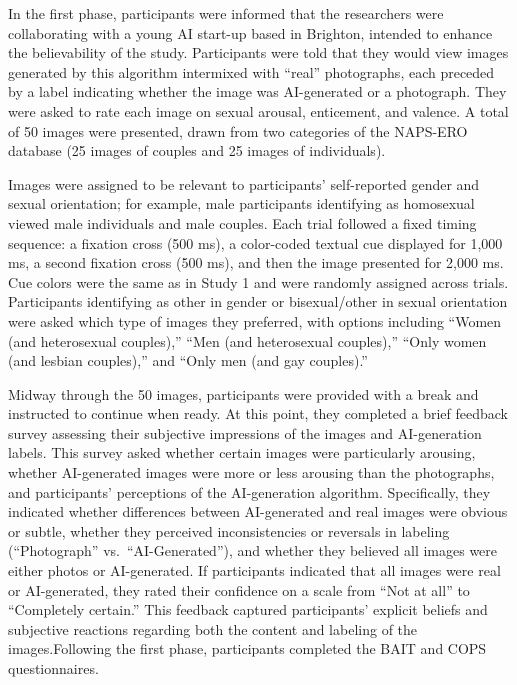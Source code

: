 \documentclass[
  jou,
  floatsintext,
  longtable,
  nolmodern,
  notxfonts,
  notimes,
  colorlinks=true,linkcolor=blue,citecolor=blue,urlcolor=blue]{apa7}
\begin{document}
In the first phase, participants were informed that the researchers were
collaborating with a young AI start-up based in Brighton, intended to
enhance the believability of the study. Participants were told that they
would view images generated by this algorithm intermixed with ``real''
photographs, each preceded by a label indicating whether the image was
AI-generated or a photograph. They were asked to rate each image on
sexual arousal, enticement, and valence. A total of 50 images were
presented, drawn from two categories of the NAPS-ERO database (25 images
of couples and 25 images of individuals).

Images were assigned to be relevant to participants' self-reported
gender and sexual orientation; for example, male participants
identifying as homosexual viewed male individuals and male couples. Each
trial followed a fixed timing sequence: a fixation cross (500 ms), a
color-coded textual cue displayed for 1,000 ms, a second fixation cross
(500 ms), and then the image presented for 2,000 ms. Cue colors were the
same as in Study 1 and were randomly assigned across trials.
Participants identifying as other in gender or bisexual/other in sexual
orientation were asked which type of images they preferred, with options
including ``Women (and heterosexual couples),'' ``Men (and heterosexual
couples),'' ``Only women (and lesbian couples),'' and ``Only men (and
gay couples).''

Midway through the 50 images, participants were provided with a break
and instructed to continue when ready. At this point, they completed a
brief feedback survey assessing their subjective impressions of the
images and AI-generation labels. This survey asked whether certain
images were particularly arousing, whether AI-generated images were more
or less arousing than the photographs, and participants' perceptions of
the AI-generation algorithm. Specifically, they indicated whether
differences between AI-generated and real images were obvious or subtle,
whether they perceived inconsistencies or reversals in labeling
(``Photograph'' vs.~``AI-Generated''), and whether they believed all
images were either photos or AI-generated. If participants indicated
that all images were real or AI-generated, they rated their confidence
on a scale from ``Not at all'' to ``Completely certain.'' This feedback
captured participants' explicit beliefs and subjective reactions
regarding both the content and labeling of the images.Following the
first phase, participants completed the BAIT and COPS questionnaires.
\end{document}
